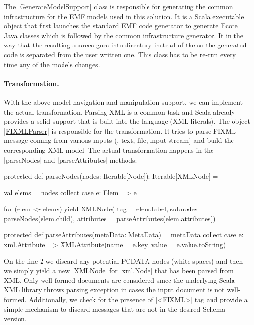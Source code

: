 The \href{https://github.com/fikovnik/ttc14-fixml-sigma/blob/master/ttc14-fixml-base/src/fr/inria/spirals/sigma/ttc14/fixml/support/GenerateModelSupport.scala}{\Scala|GenerateModelSupport|} class is responsible for generating the common infrastructure for the EMF models used in this solution.
It is a Scala executable object that first launches the standard EMF code generator to generate Ecore Java classes which is followed by the \SIGMA common infrastructure generator.
It in the way that the resulting sources goes into  directory instead of the  so the generated code is separated from the user written one.
This class has to be re-run every time any of the models changes.

\paragraph{Transformation.}
%
With the above model navigation and manipulation support, we can implement the actual transformation.
Parsing XML is a common task and Scala already provides a solid support that is built into the language (\Eg XML literals).
The object \href{https://github.com/fikovnik/ttc14-fixml-sigma/blob/master/ttc14-fixml-base/src/fr/inria/spirals/sigma/ttc14/fixml/FIXMLParser.scala}{\Scala|FIXMLParser|} is responsible for the transformation.
It tries to parse FIXML message coming from various inputs (\Eg, text, file, input stream) and build the corresponding XML model.
The actual transformation happens in the \Scala|parseNodes| and \Scala|parseAttributes| methods:

\begin{scalacode}
protected def parseNodes(nodes: Iterable[Node]): Iterable[XMLNode] = {
  val elems = nodes collect { case e: Elem => e }

  for (elem <- elems) yield XMLNode(
    tag = elem.label,
    subnodes = parseNodes(elem.child),
    attributes = parseAttributes(elem.attributes))
}

protected def parseAttributes(metaData: MetaData) =
  metaData collect {
    case e: xml.Attribute => XMLAttribute(name = e.key, value = e.value.toString)
  }
\end{scalacode}

On the line 2 we discard any potential PCDATA nodes (\Eg white spaces) and then we simply yield a new \Scala|XMLNode| for \Scala|xml.Node| that has been parsed from XML.
Only well-formed documents are considered since the underlying Scala XML library throws parsing exception in cases the input document is not well-formed.
Additionally, we check for the presence of \xmlinline|<FIXML>| tag and provide a simple mechanism to discard \FIXML messages that are not in the desired  Schema version.

